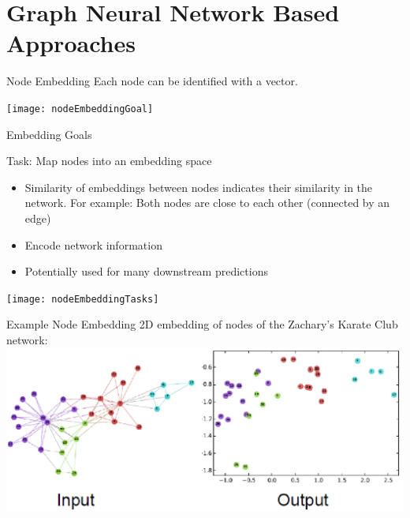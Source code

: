 \section{Graph Neural Network Based Approaches}

\begin{frame}[t]{Node Embedding}\vspace{10pt}
    Each node can be identified with a vector.\vspace{20pt}
    
    \texttt{[image: nodeEmbeddingGoal]}
\end{frame}

\begin{frame}[t]{Embedding Goals}

    \begin{block}{Task: Map nodes into an embedding space}
    
        \begin{itemize}
        
            \item Similarity of embeddings between nodes indicates their similarity in the network. For example: Both nodes are close to each other (connected by an edge)

            \item Encode network information
            
            \item Potentially used for many downstream predictions
        \end{itemize}
        
    \end{block}

    \texttt{[image: nodeEmbeddingTasks]}
    
\end{frame}

\begin{frame}[t]{Example Node Embedding}
    2D embedding of nodes of the Zachary’s Karate Club network:\\ \vspace{20pt}
    \includegraphics[scale=.3]{images/Zakarys2DExample.png}
\end{frame}

